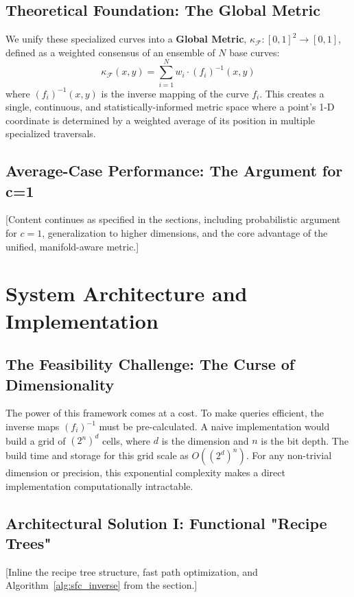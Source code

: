 \documentclass[sigconf]{acmart}
\begin{document}
\subsection{Theoretical Foundation: The Global Metric}
We unify these specialized curves into a \textbf{Global Metric}, $\kappa_{\mathcal{F}}: [0,1]^2 \to [0,1]$, defined as a weighted consensus of an ensemble of $N$ base curves:
\begin{equation}
 \kappa_{\mathcal{F}}(x,y) = \sum_{i=1}^N w_i \cdot (f_i)^{-1}(x,y)
\end{equation}
where $(f_i)^{-1}(x,y)$ is the inverse mapping of the curve $f_i$. This creates a single, continuous, and statistically-informed metric space where a point's 1-D coordinate is determined by a weighted average of its position in multiple specialized traversals.

\subsection{Average-Case Performance: The Argument for c=1}
[Content continues as specified in the sections, including probabilistic argument for $c=1$, generalization to higher dimensions, and the core advantage of the unified, manifold-aware metric.]

\section{System Architecture and Implementation}
\subsection{The Feasibility Challenge: The Curse of Dimensionality}
The power of this framework comes at a cost. To make queries efficient, the inverse maps $(f_i)^{-1}$ must be pre-calculated. A naive implementation would build a grid of $(2^n)^d$ cells, where $d$ is the dimension and $n$ is the bit depth. The build time and storage for this grid scale as $O((2^d)^n)$. For any non-trivial dimension or precision, this exponential complexity makes a direct implementation computationally intractable.

\subsection{Architectural Solution I: Functional "Recipe Trees"}
[Inline the recipe tree structure, fast path optimization, and Algorithm~\ref{alg:sfc_inverse} from the section.]
\end{document}
